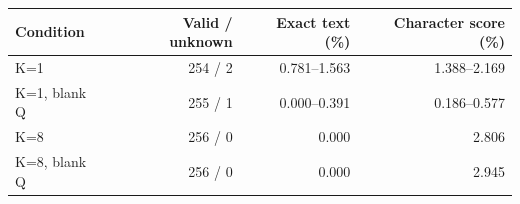 \begin{center}\small
\begin{tabular}{lrrr}\toprule
Condition & Valid / unknown & Exact text (\%) & Character score (\%)\\\midrule
K=1 & 254 / 2 & 0.781--1.563 & 1.388--2.169\\
K=1, blank Q & 255 / 1 & 0.000--0.391 & 0.186--0.577\\
K=8 & 256 / 0 & 0.000 & 2.806\\
K=8, blank Q & 256 / 0 & 0.000 & 2.945\\
\bottomrule\end{tabular}
\end{center}
